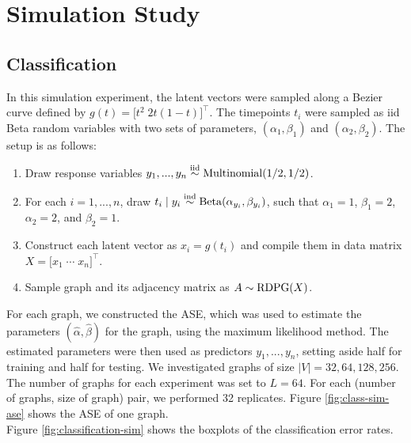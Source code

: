 \documentclass[12pt]{article}
\providecommand{\tightlist}{%
  \setlength{\itemsep}{0pt}\setlength{\parskip}{0pt}}
\begin{document}
\begin{theorem}
\end{theorem}

\hypertarget{simulation-study}{%
\section{Simulation Study}\label{simulation-study}}

\hypertarget{classification}{%
\subsection{Classification}\label{classification}}

In this simulation experiment, the latent vectors were sampled along a
Bezier curve defined by \(g(t) = \bigl[ t^2 \; 2 t (1-t) \bigr]^\top\).
The timepoints \(t_i\) were sampled as iid Beta random variables with
two sets of parameters, \((\alpha_1, \beta_1)\) and
\((\alpha_2, \beta_2)\). The setup is as follows:

\begin{enumerate}
\def\labelenumi{\arabic{enumi}.}
\tightlist
\item
  Draw response variables \(y_1, ..., y_n \stackrel{\mathrm{iid}}{\sim} \mathrm{Multinomial}(1/2, 1/2)\).
\item
  For each \(i = 1, ..., n\), draw
  \(t_i \mid y_i \stackrel{\mathrm{ind}}{\sim} \mathrm{Beta}(\alpha_{y_i}, \beta_{y_i})\), such
  that \(\alpha_1 = 1\), \(\beta_1 = 2\), \(\alpha_2 = 2\), and
  \(\beta_2 = 1\).
\item
  Construct each latent vector as \(x_i = g(t_i)\) and compile them in
  data matrix \(X = \bigl[ x_1 \; \cdots \; x_n \bigr]^\top\).
\item
  Sample graph and its adjacency matrix as \(A \sim \mathrm{RDPG}(X)\).
\end{enumerate}

For each graph, we constructed the ASE, which was used to estimate the
parameters \((\hat{\alpha}, \hat{\beta})\) for the graph, using the
maximum likelihood method. The estimated parameters were then used as
predictors \(y_1, ..., y_n\), setting aside half for training and half
for testing. We investigated graphs of size \(|V| = 32, 64, 128, 256\).
The number of graphs for each experiment was set to \(L = 64\). For each
(number of graphs, size of graph) pair, we performed 32 replicates.
Figure \ref{fig:class-sim-ase} shows the ASE of one graph.\\
Figure \ref{fig:classification-sim} shows the boxplots of the
classification error rates.
\end{document}
